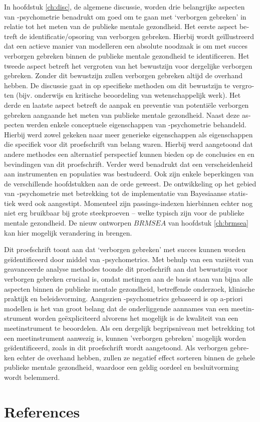 \begin{otherlanguage}{dutch}
In hoofdstuk \ref{ch:disc}, de algemene discussie, worden drie belangrijke aspecten van \textbeta-psychometrie benadrukt om goed om te gaan met `verborgen gebreken' in relatie tot het meten van de publieke mentale gezondheid. Het eerste aspect betreft de identificatie/opsoring van verborgen gebreken. Hierbij wordt ge\"illustreerd dat een actieve manier van modelleren een absolute noodzaak is om met succes verborgen gebreken binnen de publieke mentale gezondheid te identificeren. Het tweede aspect betreft het vergroten van het bewustzijn voor dergelijke verborgen gebreken. Zonder dit bewustzijn zullen verborgen gebreken altijd de overhand hebben. De discussie gaat in op specifieke methoden om dit bewustzijn te vergroten (bijv. onderwijs en kritische beoordeling van wetenschappelijk werk). Het derde en laatste aspect betreft de aanpak en preventie van potenti\"ele verborgen gebreken aangaande het meten van publieke mentale gezondheid. Naast deze aspecten werden enkele conceptuele eigenschappen van \textbeta-psychometrie behandeld. Hierbij werd zowel gekeken naar meer generieke eigenschappen als eigenschappen die specifiek voor dit proefschrift van belang waren. Hierbij werd aangetoond dat andere methodes een alternatief perspectief kunnen bieden op de conclusies en en bevindingen van dit proefschrift. Verder werd benadrukt dat een verscheidenheid aan instrumenten en populaties was bestudeerd. Ook zijn enkele beperkingen van de verschillende hoofdstukken aan de orde geweest. De ontwikkeling op het gebied van \textbeta-psychometrie met betrekking tot de implementatie van Bayesiaanse statistiek werd ook aangestipt. Momenteel zijn passings-indexen hierbinnen echter nog niet erg bruikbaar bij grote steekproeven -- welke typisch zijn voor de publieke mentale gezondheid. De nieuw ontworpen $BRMSEA$ van hoofdstuk \ref{ch:brmsea} kan hier mogelijk verandering in brengen.

Dit proefschrift toont aan dat `verborgen gebreken' met succes kunnen worden ge\"identificeerd door middel van \textbeta-psychometrics. Met behulp van een vari\"eteit  van geavanceerde analyse methodes toonde dit proefschrift aan dat bewustzijn voor verborgen gebreken cruciaal is, omdat metingen aan de basis staan van bijna alle aspecten binnen de publieke mentale gezondheid, betreffende onderzoek, klinische praktijk en beleidsvorming. Aangezien \textbeta-psychometrics gebaseerd is op a-priori modellen is het van groot belang dat de onderliggende aannames van een meetinstrument worden ge\"expliciteerd alvorens het mogelijk is de kwaliteit van een meetinstrument te beoordelen. Als een dergelijk begripsniveau met betrekking tot een meetinstrument aanwezig is, kunnen 'verborgen gebreken' mogelijk worden ge\"identificeerd, zoals in dit proefschrift wordt aangetoond. Als verborgen gebreken echter de overhand hebben, zullen ze negatief effect sorteren binnen de gehele publieke mentale gezondheid, waardoor een geldig oordeel en besluitvorming wordt belemmerd.

\sloppy
\section*{References}
\printbibliography[heading=none]

\fussy
\end{otherlanguage}
